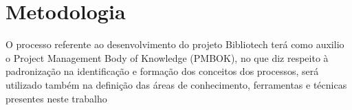 \chapter[Metodologia] {Metodologia}

O processo referente ao desenvolvimento do projeto Bibliotech terá como auxilio o Project Management Body of Knowledge (PMBOK), no que diz respeito à padronização na identificação e formação dos conceitos dos processos, será utilizado também na definição das áreas de conhecimento, ferramentas e técnicas presentes neste trabalho \cite{pmbok2004}
